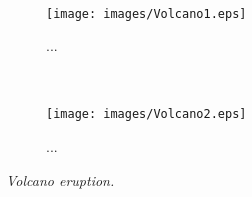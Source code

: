 \\
\begin{figure}[H]
\begin{subfigure}{\textwidth}
  \centering
  \texttt{[image: images/Volcano1.eps]}
  \caption{...}
  \label{fig:vulcano1}
\end{subfigure}%
\\
\begin{subfigure}{\textwidth}
  \centering
  \texttt{[image: images/Volcano2.eps]}
  \caption{...}
  \label{fig:vulcano2}
\end{subfigure}
\caption[Noise comparison]{\textit{Volcano eruption.}}
\label{fig:vulcano3}
\end{figure}




